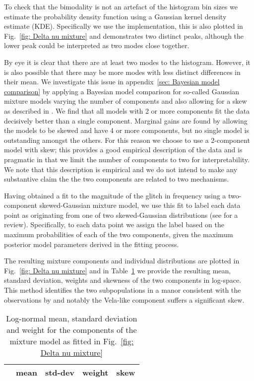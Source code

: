 \documentclass[../full_thesis/full_thesis.tex]{subfiles}
\newcommand{\thisdir}{../glitches_in_CGW}
\begin{document}
To check that the bimodality is not an artefact of the histogram bin sizes we
estimate the probability density function using a Gaussian kernel density
estimate (KDE). Specifically we use the \citet{Scipy} implementation, this is
also plotted in Fig.~\ref{fig: Delta nu mixture} and demonstrates two distinct
peaks, although the lower peak could be interpreted as two modes close together.

By eye it is clear that there are at least two modes to the histogram. However,
it is also possible that there may be more modes with less distinct differences
in their mean. We investigate this issue in appendix~\ref{sec: Bayesian model
comparison} by applying a Bayesian model comparison for so-called Gaussian
mixture models varying the number of components and also allowing for a skew as
described in \citet{Ohagan1976}.  We find that all models with 2 or more
components fit the data decisively better than a single component. Marginal
gains are found by allowing the models to be skewed and have 4 or more
components, but no single model is outstanding amongst the others. For this
reason we choose to use a 2-component model with skew; this provides a good
empirical description of the data and is pragmatic in that we limit the number of
components to two for interpretability. We note that this description is
empirical and we do not intend to make any substantive claim the the two components
are related to two mechanisms.

Having obtained a fit to the magnitude of the glitch in frequency using a
two-component skewed-Gaussian mixture model, we use this fit to label
each data point as originating from one of two skewed-Gaussian distributions
(see \citet{gelman2013bayesian} for a review). Specifically, to each data point
we assign the label based on the maximum probabilities of each of the two
components, given the maximum posterior model parameters derived in the fitting
process.

The resulting mixture components and individual
distributions are plotted in Fig.~\ref{fig: Delta nu mixture} and in
Table~\ref{tab: mixture components} we provide the resulting mean, standard
deviation, weights and skewness of the two components in log-space.
This method identifies the two subpopulations in a manor consistent with the
observations by \citet{Espinoza2011} and notably the Vela-like component suffers
a significant skew.

\begin{table}[htb]
\begin{tabular}{lcccc}
& mean & std-dev & weight & skew \\ \hline

\end{tabular}
\caption{Log-normal mean, standard deviation and weight for the components of
the mixture model as fitted in Fig.~\ref{fig: Delta nu mixture}}
\label{tab: mixture components}
\end{table}
\end{document}
